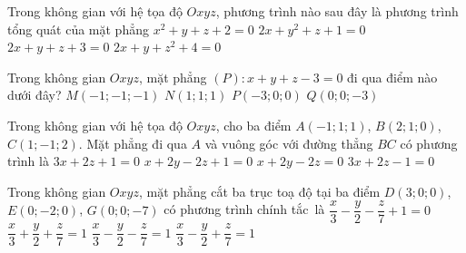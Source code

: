 \begin{ex}%
	Trong không gian với hệ tọa độ $Oxyz$, phương trình nào  sau đây là phương trình tổng quát của mặt phẳng
	 \choice
		 {$x^2+y+z+2=0$}
		 {$2 x+y^2+z+1=0$}
		 {\True $2 x+y+z+3=0$}
		{$2  x+y+z^2+4=0$}
\end{ex}

\begin{ex}%
	Trong không gian $Oxyz$, mặt phẳng $(P) \colon x+y+z-3=0$ đi qua điểm  nào dưới đây?
	 \choice
		 {$M(-1;-1;-1)$}
		 {\True $N(1;1;1)$}
		 {$P(-3;0;0)$}
		 {$Q(0;0;-3)$}
\end{ex}

\begin{ex}%
	Trong không  gian với hệ tọa độ $Oxyz$, cho ba điểm $A(-1;1;1)$, $B(2;1;0)$, $C(1;-1;2)$. Mặt phẳng đi qua $A$ và vuông góc với đường thẳng $BC$ có phương trình là
	 \choice
		{$3x + 2z  + 1 = 0$}
		{\True $x +  2y - 2z + 1 = 0$}
		{$x +  2y - 2z = 0$}
		{$3x + 2z  - 1 = 0$}
\end{ex}

\begin{ex}%
	Trong không gian $Oxyz$, mặt phẳng  cắt ba trục toạ độ tại ba điểm $D(3; 0; 0)$, $E(0;-2; 0)$, $G(0; 0; -7)$ có phương trình chính tắc~là
	\choice 
		 {$\dfrac{x}{3}-\dfrac{y}{2}-\dfrac{z}{7}+1=0$}
		 {$\dfrac{x}{3}+\dfrac{y}{2}+\dfrac{z}{7}=1$}
		 {\True $\dfrac{x}{3}-\dfrac{y}{2}-\dfrac{z}{7}=1$}
		 {$\dfrac{x}{3}-\dfrac{y}{2}+\dfrac{z}{7}=1$}
\end{ex}

